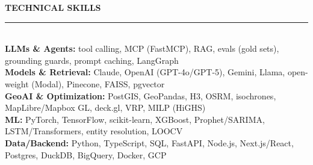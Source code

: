 \documentclass[10pt]{resume_gairo_peralta_openfont}
\renewcommand{\section}[1]{%
  \vspace{3pt}%
  \raggedright{
    {\Large\bfseries\textcolor{sectioncolor}{\uppercase{#1}}}
  }\\[-0.6em]
  \rule{\textwidth}{0.5pt}\\[0.05em] %
}
\begin{document}
\section{TECHNICAL SKILLS}
\vspace{-0.2em}
\textbf{LLMs \& Agents:} tool calling, MCP (FastMCP), RAG, evals (gold sets), grounding guards, prompt caching, LangGraph \\
\vspace{0.1em}
\textbf{Models \& Retrieval:} Claude, OpenAI (GPT-4o/GPT-5), Gemini, Llama, open-weight (Modal), Pinecone, FAISS, pgvector \\
\vspace{0.1em}
\textbf{GeoAI \& Optimization:} PostGIS, GeoPandas, H3, OSRM, isochrones, MapLibre/Mapbox GL, deck.gl, VRP, MILP (HiGHS) \\
\vspace{0.1em}
\textbf{ML:} PyTorch, TensorFlow, scikit-learn, XGBoost, Prophet/SARIMA, LSTM/Transformers, entity resolution, LOOCV \\
\vspace{0.1em}
\textbf{Data/Backend:} Python, TypeScript, SQL, FastAPI, Node.js, Next.js/React, Postgres, DuckDB, BigQuery, Docker, GCP
\end{document}
